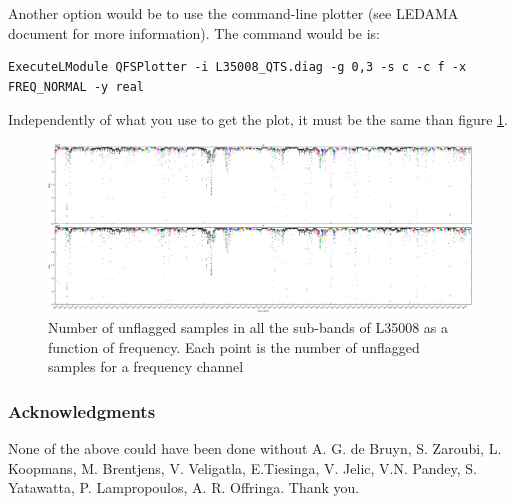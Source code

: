 \documentclass[a4paper,11pt]{article}
\begin{document}
Another option would be to use the command-line plotter (see LEDAMA document for more information). The command would be is:
\begin{verbatim}
ExecuteLModule QFSPlotter -i L35008_QTS.diag -g 0,3 -s c -c f -x FREQ_NORMAL -y real
\end{verbatim}

Independently of what you use to get the plot, it must be the same than figure \ref{fig:l35008qfs}.

\begin{figure}[h]
	\centering
	\includegraphics[scale=0.25]{fig/l35008qfs} 
	\caption{Number of unflagged samples in all the sub-bands of L35008 as a function of frequency. Each point is the number of unflagged samples for a frequency channel}
	\label{fig:l35008qfs}
\end{figure}

\subsubsection*{Acknowledgments}

None of the above could have been done without A. G. de Bruyn, S. Zaroubi, L. Koopmans, M. Brentjens, V. Veligatla, E.Tiesinga, V. Jelic, V.N. Pandey, S. Yatawatta, P. Lampropoulos, A. R. Offringa. Thank you.
\end{document}
